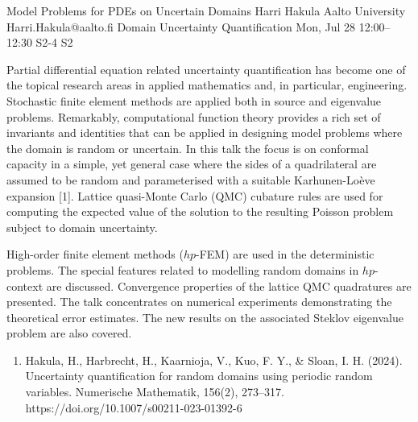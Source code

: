 \documentclass[12pt,lettersize,oneside]{book} %
\begin{document}
\begin{talk}
  {Model Problems for PDEs on Uncertain Domains}%
  {Harri Hakula}%
  {Aalto University}%
  {Harri.Hakula@aalto.fi}%
  {Domain Uncertainty Quantification}%
  {}%
  {Mon, Jul 28 12:00--12:30}%
  {S2-4}%
  {S2}%
    
   
Partial differential equation related uncertainty quantification has become one of the
topical research areas in applied mathematics and, in particular, engineering.
Stochastic finite element methods are applied both in source and eigenvalue problems.
Remarkably, computational function theory provides a rich set of invariants 
and identities that
can be applied in designing model problems where the domain is random or uncertain. 
In this talk the focus is on conformal capacity in a simple, 
yet general case where the sides of a quadrilateral are assumed to be random 
and parameterised with a suitable Karhunen-Lo\`eve expansion [1].
Lattice quasi-Monte Carlo (QMC) cubature rules are used for computing the expected value of the solution to the resulting Poisson problem subject to domain uncertainty. 

High-order finite element methods ($hp$-FEM) are used in the deterministic problems.
The special features related to modelling random domains in $hp$-context are discussed.
Convergence properties of the lattice QMC quadratures are presented. The talk
concentrates on numerical experiments demonstrating the theoretical error estimates.
The new results on the associated Steklov eigenvalue problem are also covered.


\medskip

\begin{enumerate}
 \item[{[1]}] Hakula, H., Harbrecht, H., Kaarnioja, V., Kuo, F. Y., \& Sloan, I. H. (2024). Uncertainty quantification for random domains using periodic random variables. Numerische Mathematik, 156(2), 273--317. https://doi.org/10.1007/s00211-023-01392-6
\end{enumerate}

\end{talk}
\end{document}
